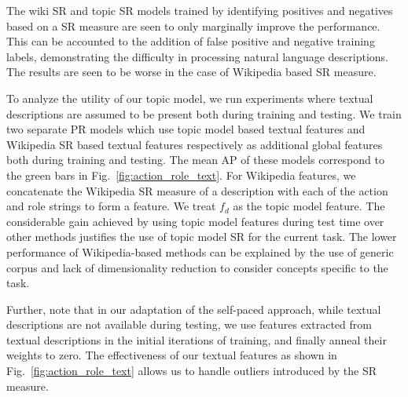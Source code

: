 \documentclass[10pt,twocolumn,letterpaper]{article}
\begin{document}
The wiki SR and topic SR models trained by identifying positives and negatives based on a SR measure are seen to only marginally improve the performance. This can be accounted to the addition of false positive and negative training labels, demonstrating the difficulty in processing natural language descriptions. The results are seen to be worse in the case of Wikipedia based SR measure. %

To analyze the utility of our topic model, we run experiments 
where textual descriptions are assumed to be present both
during training and testing. We train two separate PR models which use topic
model based textual features and Wikipedia SR based textual features
respectively as additional global features both during training and testing.
The mean AP of these models correspond to the green bars in
Fig.~\ref{fig:action_role_text}. For Wikipedia features, we concatenate the
Wikipedia SR measure of a description with each of the action and role strings
to form a feature. We treat $f_d$ as the topic model feature. The
considerable gain achieved by using topic model features during test time over
other methods justifies the use of topic model SR for the current task. The
lower performance of Wikipedia-based methods can be explained by the use of
generic corpus and lack of dimensionality reduction to consider concepts
specific to the task.

Further, note that in our adaptation of the self-paced approach, 
while textual descriptions are not available during testing, 
we use features extracted from textual descriptions in the initial iterations of training, 
and finally anneal their weights to zero. The effectiveness of our textual features as shown in Fig.~\ref{fig:action_role_text} allows us to 
handle outliers introduced by the SR measure.
\end{document}
